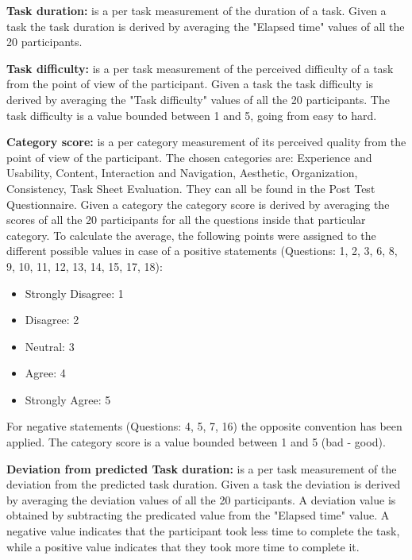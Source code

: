 \vspace{0.25cm}

\textbf{Task duration:} is a per task measurement of the duration of a task. Given a task the task duration is derived by averaging the "Elapsed time" values of all the 20 participants.

\vspace{0.25cm}

\textbf{Task difficulty:} is a per task measurement of the perceived difficulty of a task from the point of view of the participant. Given a task the task difficulty is derived by averaging the "Task difficulty" values of all the 20 participants. The task difficulty is a value bounded between 1 and 5, going from easy to hard.

\vspace{0.25cm}

\textbf{Category score:} is a per category measurement of its perceived quality from the point of view of the participant. The chosen categories are: Experience and Usability, Content, Interaction and Navigation, Aesthetic, Organization, Consistency, Task Sheet Evaluation. They can all be found in the Post Test Questionnaire. Given a category the category score is derived by averaging the scores of all the 20 participants for all the questions inside that particular category. To calculate the average, the following points were assigned to the different possible values in case of a positive statements (Questions: 1, 2, 3, 6, 8, 9, 10, 11, 12, 13, 14, 15, 17, 18):
\begin{itemize}
	\item Strongly Disagree: 1
	\item Disagree: 2
	\item Neutral: 3
	\item Agree: 4
	\item Strongly Agree: 5
\end{itemize}
For negative statements (Questions: 4, 5, 7, 16) the opposite convention has been applied.
The category score is a value bounded between 1 and 5 (bad - good).

\vspace{0.25cm}

\textbf{Deviation from predicted Task duration:} is a per task measurement of the deviation from the predicted task duration. Given a task the deviation is derived by averaging the deviation values of all the 20 participants. A deviation value is obtained by subtracting the predicated value from the "Elapsed time" value. A negative value indicates that the participant took less time to complete the task, while a positive value indicates that they took more time to complete it.

